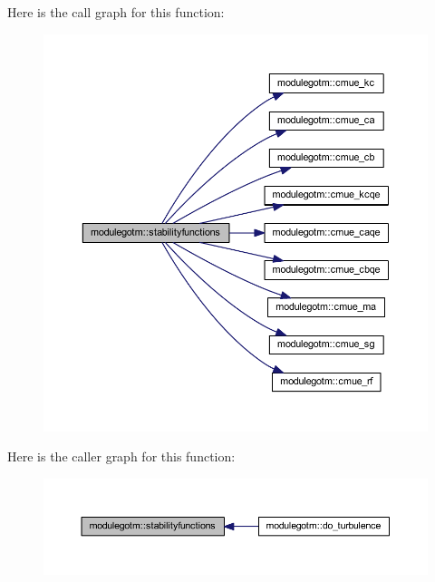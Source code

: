 Here is the call graph for this function\+:\nopagebreak
\begin{figure}[H]
\begin{center}
\leavevmode
\includegraphics[width=350pt]{namespacemodulegotm_a0e2f0ad43d12c00ed95b6fdef24dc5eb_cgraph}
\end{center}
\end{figure}
Here is the caller graph for this function\+:\nopagebreak
\begin{figure}[H]
\begin{center}
\leavevmode
\includegraphics[width=350pt]{namespacemodulegotm_a0e2f0ad43d12c00ed95b6fdef24dc5eb_icgraph}
\end{center}
\end{figure}
\mbox{\label{namespacemodulegotm_afc07b47188fabbcdd572769fce2e7e97}} 
